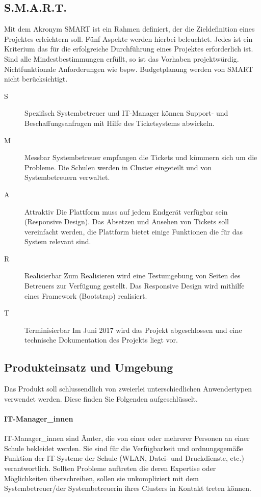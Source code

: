 \subsection{S.M.A.R.T.}
\vspace{-.4cm}
Mit dem Akronym SMART ist ein Rahmen definiert, der die Zieldefinition eines Projektes erleichtern soll. Fünf Aspekte werden hierbei beleuchtet. Jedes ist ein Kriterium das für die erfolgreiche Durchführung eines Projektes erforderlich ist. Sind alle Mindestbestimmungen erfüllt, so ist das Vorhaben \glqq projektwürdig\grqq. Nichtfunktionale Anforderungen wie bspw. Budgetplanung werden von SMART nicht berücksichtigt.
\vspace{-.25cm}
\begin{description}
	\item[S] Spezifisch\newline
	Systembetreuer und IT-Manager können Support- und Beschaffungsanfragen mit Hilfe des Ticketsystems abwickeln.
	\item[M] Messbar\newline
	Systembetreuer empfangen die Tickets und kümmern sich um die Probleme. Die Schulen werden in Cluster eingeteilt und von Systembetreuern verwaltet. 
	\item[A] Attraktiv\newline
	Die Plattform muss auf jedem Endgerät verfügbar sein (Responsive Design). Das Absetzen und Ansehen von Tickets soll vereinfacht werden, die Plattform bietet einige Funktionen die für das System relevant sind.
	\item[R] Realisierbar\newline
	Zum Realisieren wird eine Testumgebung von Seiten des Betreuers zur Verfügung gestellt. Das Responsive Design wird mithilfe eines Framework (Bootstrap) realisiert.
	\item[T] Terminisierbar\newline
	Im Juni 2017 wird das Projekt abgeschlossen und eine technische Dokumentation des Projekts liegt vor.
\end{description}


\subsection{Produkteinsatz und Umgebung}
Das Produkt soll schlussendlich von zweierlei unterschiedlichen Anwendertypen verwendet werden. Diese finden Sie Folgenden aufgeschlüsselt.

\paragraph{IT-Manager\_innen}
IT-Manager\_innen sind \glqq Ämter\grqq, die von einer oder mehrerer Personen an einer Schule bekleidet werden. Sie sind für die Verfügbarkeit und ordnungsgemäße Funktion der IT-Systeme der Schule (WLAN, Datei- und Druckdienste, etc.) verantwortlich. Sollten Probleme auftreten die deren Expertise oder Möglichkeiten überschreiben, sollen sie unkompliziert mit dem Systembetreuer/der Systembetreuerin ihres Clusters in Kontakt treten können.

